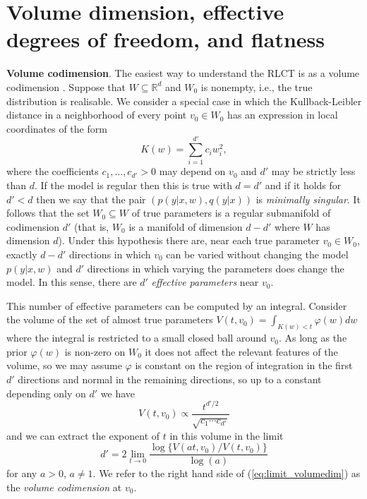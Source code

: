 \documentclass{article} %
\def\be{\begin{equation}}
\def\ee{\end{equation}}
\begin{document}
\section{Volume dimension, effective degrees of freedom, and flatness}
\label{section:no_flat_minima}

\textbf{Volume codimension}. The easiest way to understand the RLCT is as a volume codimension \citep[Theorem 7.1]{watanabe_algebraic_2009}.  Suppose that $W \subseteq \mathbb{R}^d$ and $W_0$ is nonempty, i.e., the true distribution is realisable. We consider a special case in which the Kullback-Leibler distance in a neighborhood of every point $v_0 \in W_0$ has an expression in local coordinates of the form
\begin{equation}\label{eq:local_Kw}
K(w) = \sum_{i=1}^{d'} c_i w_i^2,
\end{equation} %
where the coefficients $c_1,\ldots,c_{d'} > 0$ may depend on $v_0$ and $d'$ may be strictly less than $d$. If the model is regular then this is true with $d = d'$ and if it holds for $d' < d$ then we say that the pair $(p(y|x,w),q(y|x))$ is \emph{minimally singular}. It follows that the set $W_0 \subseteq W$ of true parameters is a regular submanifold of codimension $d'$ (that is, $W_0$ is a manifold of dimension $d - d'$ where $W$ has dimension $d$). Under this hypothesis there are, near each true parameter $v_0 \in W_0$, exactly $d - d'$ directions in which $v_0$ can be varied without changing the model $p(y|x,w)$ and $d'$ directions in which varying the parameters does change the model. In this sense, there are $d'$ \emph{effective parameters} near $v_0$. 

This number of effective parameters can be computed by an integral. Consider the volume of the set of almost true parameters
$
V(t,v_0) = \int_{K(w) < t} \varphi(w) dw
$
where the integral is restricted to a small closed ball around $v_0$. As long as the prior $\varphi(w)$ is non-zero on $W_0$ it does not affect the relevant features of the volume, so we may assume $\varphi$ is constant on the region of integration in the first $d'$ directions and normal in the remaining directions, so up to a constant depending only on $d'$ we have
\begin{equation}\label{eq:volume_singular}
V(t,v_0) \propto  \frac{t^{d'/2}}{\sqrt{c_1 \cdots c_{d'}}}
\end{equation}
and we can extract the exponent of $t$ in this volume in the limit
\be\label{eq:limit_volumedim}
d' = 2 \lim_{t \to 0} \frac{\log\big\{V(at,v_0)/V(t,v_0)\big\}}{\log(a)}
\ee
for any $a > 0$, $a \neq 1$. We refer to the right hand side of (\ref{eq:limit_volumedim}) as the \emph{volume codimension} at $v_0$. 
\end{document}
